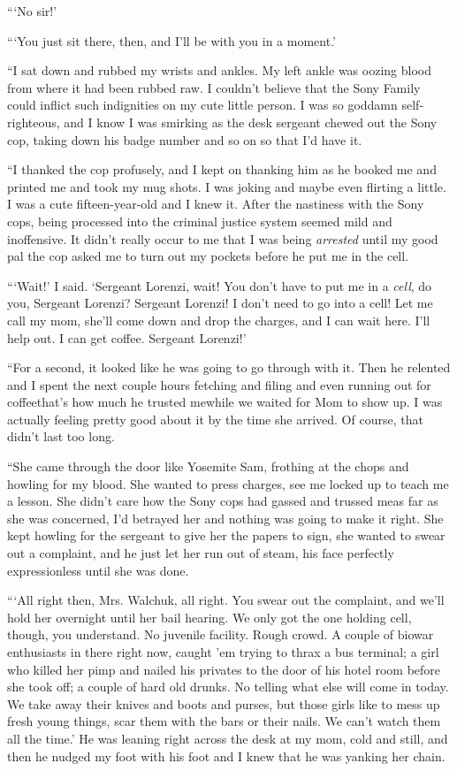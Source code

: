 “‘No sir!’

“‘You just sit there, then, and I’ll be with you in a moment.’

“I sat down and rubbed my wrists and ankles. My left ankle was
oozing blood from where it had been rubbed raw. I couldn’t believe
that the Sony Family could inflict such indignities on my cute
little person. I was so goddamn self-righteous, and I know I was
smirking as the desk sergeant chewed out the Sony cop, taking down
his badge number and so on so that I’d have it.

“I thanked the cop profusely, and I kept on thanking him as he
booked me and printed me and took my mug shots. I was joking and
maybe even flirting a little. I was a cute fifteen-year-old and I
knew it. After the nastiness with the Sony cops, being processed
into the criminal justice system seemed mild and inoffensive. It
didn’t really occur to me that I was being \emph{arrested} until my
good pal the cop asked me to turn out my pockets before he put me
in the cell.

“‘Wait!’ I said. ‘Sergeant Lorenzi, wait! You don’t have to put me
in a \emph{cell}, do you, Sergeant Lorenzi? Sergeant Lorenzi! I
don’t need to go into a cell! Let me call my mom, she’ll come down
and drop the charges, and I can wait here. I’ll help out. I can get
coffee. Sergeant Lorenzi!’

“For a second, it looked like he was going to go through with it.
Then he relented and I spent the next couple hours fetching and
filing and even running out for coffee{\dash}that’s how much he trusted
me{\dash}while we waited for Mom to show up. I was actually feeling
pretty good about it by the time she arrived. Of course, that
didn’t last too long.

“She came through the door like Yosemite Sam, frothing at the chops
and howling for my blood. She wanted to press charges, see me
locked up to teach me a lesson. She didn’t care how the Sony cops
had gassed and trussed me{\dash}as far as she was concerned, I’d betrayed
her and nothing was going to make it right. She kept howling for
the sergeant to give her the papers to sign, she wanted to swear
out a complaint, and he just let her run out of steam, his face
perfectly expressionless until she was done.

“‘All right then, Mrs. Walchuk, all right. You swear out the
complaint, and we’ll hold her overnight until her bail hearing. We
only got the one holding cell, though, you understand. No juvenile
facility. Rough crowd. A couple of biowar enthusiasts in there
right now, caught ’em trying to thrax a bus terminal; a girl who
killed her pimp and nailed his privates to the door of his hotel
room before she took off; a couple of hard old drunks. No telling
what else will come in today. We take away their knives and boots
and purses, but those girls like to mess up fresh young things,
scar them with the bars or their nails. We can’t watch them all the
time.’ He was leaning right across the desk at my mom, cold and
still, and then he nudged my foot with his foot and I knew that he
was yanking her chain.

